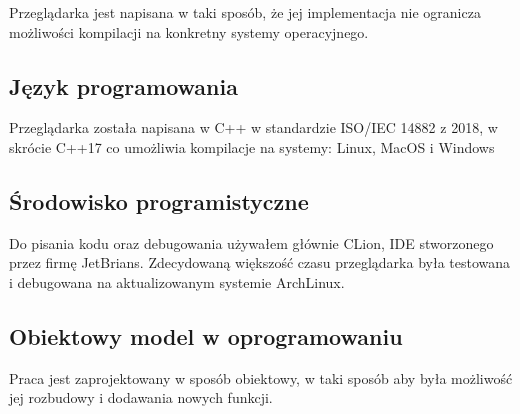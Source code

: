 Przeglądarka jest napisana w taki sposób, że jej implementacja nie ogranicza możliwości kompilacji na konkretny systemy operacyjnego.

\subsection{Język programowania}

Przeglądarka została napisana w C++ w standardzie ISO/IEC 14882 z 2018, w skrócie C++17 co umożliwia kompilacje na systemy: Linux, MacOS i Windows

\subsection{Środowisko programistyczne}

Do pisania kodu oraz debugowania używałem głównie CLion, IDE stworzonego przez firmę JetBrians.
Zdecydowaną większość czasu przeglądarka była testowana i debugowana na aktualizowanym systemie ArchLinux.

\subsection{Obiektowy model w oprogramowaniu}

Praca jest zaprojektowany w sposób obiektowy, w taki sposób aby była możliwość jej rozbudowy i dodawania nowych funkcji.